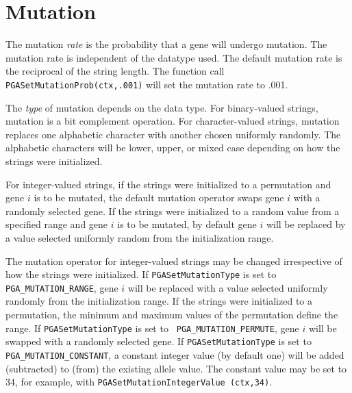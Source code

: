 \documentclass{report}
\begin{document}
\section{Mutation}\label{sec:mutation}

The mutation {\em rate} is the probability that a gene will undergo
mutation.  The mutation rate is independent of the datatype used. The default
mutation rate is the reciprocal of the string length.  The function call {\tt
PGASetMutationProb(ctx,.001)} will set the mutation rate to .001.

The {\em type} of mutation depends on the data type.  For binary-valued
strings, mutation is a bit complement operation. For
character-valued strings, mutation replaces one alphabetic character with
another chosen uniformly randomly.  The alphabetic characters will be lower,
upper, or mixed case depending on how the strings were initialized.

For integer-valued strings, if the strings were initialized to a permutation
and gene $i$ is to be mutated, the default mutation operator swaps gene $i$
with a randomly selected gene. If the strings were initialized to a random
value from a specified range and gene $i$ is to be mutated, by default gene
$i$ will be replaced by a value selected uniformly random from the
initialization range.

The mutation operator for integer-valued strings may be changed irrespective
of how the strings were initialized.  If {\tt PGASetMutationType} is set to
{\tt PGA\_MUTATION\_RANGE}, gene $i$ will be replaced with a value selected
uniformly randomly from the initialization range.  If the strings were
initialized to a permutation, the minimum and maximum values of the
permutation define the range.  If {\tt PGASetMutationType} is set to {\tt
PGA\_MUTATION\_PERMUTE}, gene $i$ will be swapped with a randomly selected
gene.  If {\tt PGASetMutationType} is set to {\tt PGA\_MUTATION\_CONSTANT}, a
constant integer value (by default one) will be added (subtracted) to (from)
the existing allele value.  The constant value may be set to 34, for example,
with {\tt PGASetMutationIntegerValue (ctx,34)}.
\end{document}
